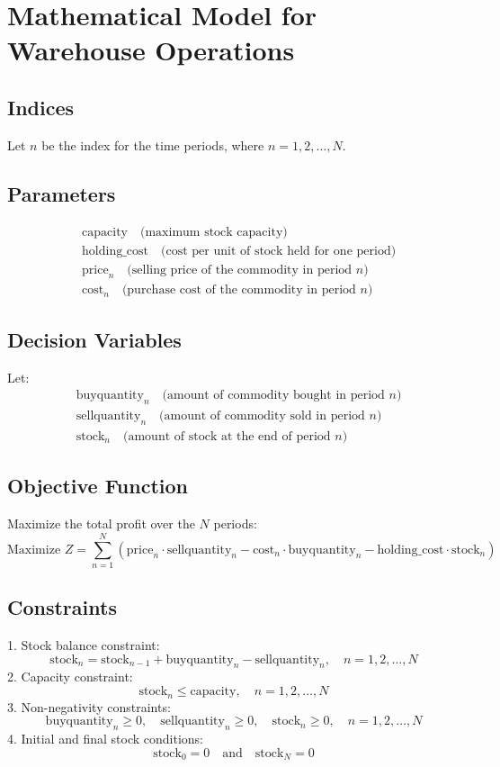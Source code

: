\documentclass{article}
\begin{document}
\section*{Mathematical Model for Warehouse Operations}

\subsection*{Indices}
Let \( n \) be the index for the time periods, where \( n = 1, 2, \ldots, N \).

\subsection*{Parameters}
\begin{align*}
& \text{capacity} \quad \text{(maximum stock capacity)} \\
& \text{holding\_cost} \quad \text{(cost per unit of stock held for one period)} \\
& \text{price}_{n} \quad \text{(selling price of the commodity in period } n\text{)} \\
& \text{cost}_{n} \quad \text{(purchase cost of the commodity in period } n\text{)}
\end{align*}

\subsection*{Decision Variables}
Let:
\begin{align*}
& \text{buyquantity}_{n} \quad \text{(amount of commodity bought in period } n\text{)} \\
& \text{sellquantity}_{n} \quad \text{(amount of commodity sold in period } n\text{)} \\
& \text{stock}_{n} \quad \text{(amount of stock at the end of period } n\text{)}
\end{align*}

\subsection*{Objective Function}
Maximize the total profit over the \( N \) periods:
\[
\text{Maximize } Z = \sum_{n=1}^{N} \left( \text{price}_{n} \cdot \text{sellquantity}_{n} - \text{cost}_{n} \cdot \text{buyquantity}_{n} - \text{holding\_cost} \cdot \text{stock}_{n} \right)
\]

\subsection*{Constraints}
1. Stock balance constraint:
\[
\text{stock}_{n} = \text{stock}_{n-1} + \text{buyquantity}_{n} - \text{sellquantity}_{n}, \quad n = 1, 2, \ldots, N
\]
2. Capacity constraint:
\[
\text{stock}_{n} \leq \text{capacity}, \quad n = 1, 2, \ldots, N
\]
3. Non-negativity constraints:
\[
\text{buyquantity}_{n} \geq 0, \quad \text{sellquantity}_{n} \geq 0, \quad \text{stock}_{n} \geq 0, \quad n = 1, 2, \ldots, N
\]
4. Initial and final stock conditions:
\[
\text{stock}_{0} = 0 \quad \text{and} \quad \text{stock}_{N} = 0
\]
\end{document}
